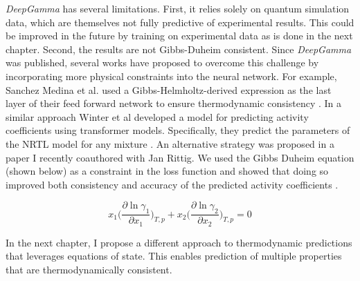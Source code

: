 \textit{DeepGamma} has several limitations. First,  it relies solely on quantum simulation data, which are themselves not fully predictive of experimental results. This could be improved in the future by training on experimental data as is done in the next chapter. Second, the results are not Gibbs-Duheim  consistent. Since \textit{DeepGamma} was published, several works have proposed to overcome this challenge by incorporating more physical constraints into the neural network. For example, Sanchez Medina et al. used  a Gibbs-Helmholtz-derived expression as the last layer of their feed forward network to ensure thermodynamic consistency \cite{SanchezMedina2023b}. In a similar approach Winter et al developed a model for predicting activity coefficients using transformer models. Specifically, they predict the parameters of the NRTL model for any mixture \cite{Winter2022}. An alternative strategy was proposed in a paper I recently coauthored with Jan Rittig. We used the Gibbs Duheim equation (shown below) as a constraint in the loss function and showed that doing so improved both consistency and accuracy of the predicted activity coefficients \cite{Rittig2023b}.

\begin{equation}
    x_1 \biggl (\frac{\partial \ln \gamma_1}{\partial x_1}\biggr)_{T,p} + x_2 \biggl (\frac{\partial \ln \gamma_2}{\partial x_2}\biggr)_{T,p} = 0
\end{equation}

In the next chapter, I propose a different approach to thermodynamic predictions that leverages equations of state. This enables prediction of multiple properties that are thermodynamically consistent.

